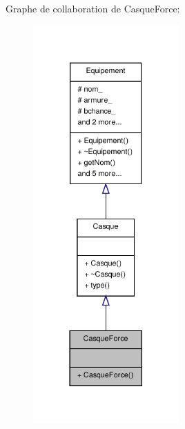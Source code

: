 Graphe de collaboration de Casque\-Force\-:
\nopagebreak
\begin{figure}[H]
\begin{center}
\leavevmode
\includegraphics[width=158pt]{class_casque_force__coll__graph}
\end{center}
\end{figure}
